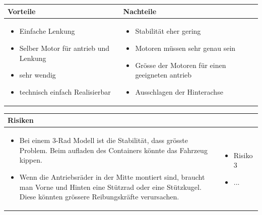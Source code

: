 \begin{table}[h]
\begin{tabular}{p{} | p{}}


 \textbf{Vorteile} & \textbf{Nachteile} \\ \hline
	 
\begin{itemize}
\item Einfache Lenkung
\item Selber Motor für antrieb und Lenkung
\item sehr wendig
\item technisch einfach Realisierbar
\end{itemize}

 
 &
 
\begin{itemize}
\item Stabilität eher gering
\item Motoren müssen sehr genau sein
\item Grösse der Motoren für einen geeigneten antrieb 
\item Ausschlagen der Hinterachse
\end{itemize}

\end{tabular}
\end{table}

\begin{table}[h]
\begin{tabular}{p{}p{}}


 \textbf{Risiken} & \\ \hline
	 
\begin{itemize}
\item Bei einem 3-Rad Modell ist die Stabilität, dass grösste Problem. Beim aufladen des Containers könnte das Fahrzeug kippen.
\item Wenn die Antriebsräder in der Mitte montiert sind, braucht man Vorne und Hinten eine Stützrad oder eine Stützkugel. Diese könnten grössere Reibungskräfte verursachen.
\end{itemize}
&
\begin{itemize}
\item Risiko 3
\item ...
\end{itemize}

 
\end{tabular}
\end{table}

\pagebreak